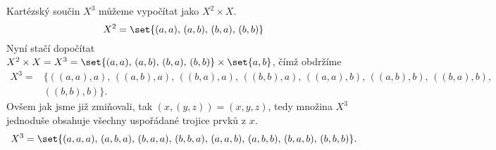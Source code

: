 \begin{solution}
    Kartézský součin $X^3$ můžeme vypočítat jako $X^2\times X$.
    \begin{equation*}
        X^2=\set{(a,a),\,(a,b),\,(b,a),\,(b,b)}
    \end{equation*}
    Nyní stačí dopočítat $X^2\times X=X^3=\set{(a,a),\,(a,b),\,(b,a),\,(b,b)}\times\set{a,b}$, čímž obdržíme
    \begin{align*}
        X^3=&\{((a,a),a),\,((a,b),a),\,((b,a),a),\,((b,b),a),\,((a,a),b),\,((a,b),b),\,((b,a),b),\\
        &((b,b),b)\}.
    \end{align*}
    Ovšem jak jsme již zmiňovali, tak $(x,(y,z))=(x,y,z)$, tedy množina $X^3$ jednoduše obsahuje všechny uspořádané trojice prvků z $x$.
    \begin{equation*}
        X^3=\set{(a,a,a),\,(a,b,a),\,(b,a,a),\,(b,b,a),\,(a,a,b),\,(a,b,b),\,(b,a,b),\,(b,b,b)}.
    \end{equation*}
\end{solution}